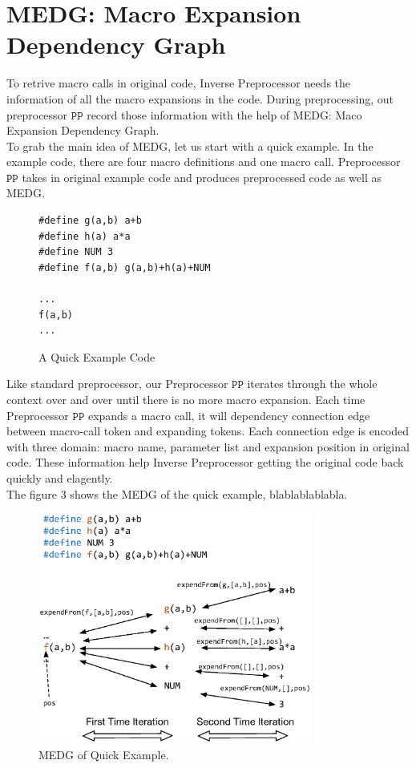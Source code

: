 \documentclass[11pt]{article}
\theoremstyle{theorem}
\theoremstyle{lemma}
\theoremstyle{property}
\theoremstyle{definition}
\theoremstyle{assumption}
\begin{document}
\newpage

\section{MEDG: Macro Expansion Dependency Graph}

To retrive macro calls in original code, Inverse Preprocessor needs the information of all the macro expansions in the code. 
During preprocessing, out preprocessor $\mathtt{PP}$ record those information with the help of MEDG: Maco Expansion Dependency Graph. \\

To grab the main idea of MEDG, let us start with a quick example. 
In the example code, there are four macro definitions and one macro call.
Preprocessor $\mathtt{PP}$ takes in original example code and produces preprocessed code as well as MEDG.

\begin{figure}[H]
\begin{lstlisting}[language={[ANSI]C}, basicstyle=\ttfamily\small, keywordstyle=\color{blue!70}, commentstyle=\color{red!50!green!50!blue!50}, frame=shadowbox, rulesepcolor=\color{red!20!green!20!blue!20}]
#define g(a,b) a+b
#define h(a) a*a
#define NUM 3
#define f(a,b) g(a,b)+h(a)+NUM

...
f(a,b)
...
\end{lstlisting}
\caption{A Quick Example Code}
\end{figure}

Like standard preprocessor, our Preprocessor $\mathtt{PP}$ iterates through the whole context over and over until there is no more macro expansion. 
Each time Preprocessor $\mathtt{PP}$ expands a macro call, it will dependency connection edge between macro-call token and expanding tokens.
Each connection edge is encoded with three domain: macro name, parameter list and expansion position in original code.
These information help Inverse Preprocessor getting the original code back quickly and elagently. \\

The figure 3 shows the MEDG of the quick example, blablablablabla.\\

\begin{figure}[H]
\centering
\includegraphics[width=9cm]{quick_example.eps}
\caption{MEDG of Quick Example.}
\end{figure}
\end{document}
